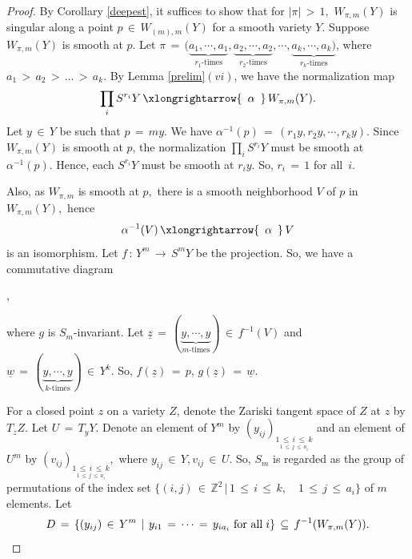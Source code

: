 \documentclass[12pt,reqno]{amsart}
\theoremstyle{definition}
\numberwithin{equation}{section}
\begin{document}
\begin{proof}
By Corollary \ref{deepest}, it suffices to show that for $ |\pi|\,>\,1,$ $ W_{\pi,m}(Y)$ is singular along a point $ p\,\in\, W_{(m),m}(Y)$ for a smooth variety $Y.$ Suppose $ W_{\pi,m}(Y)$ is smooth at $p$. Let $  \pi\,=\, (\underbrace{a_{1},\cdots,a_{1}}_{r_{1}\text{-times}}, \underbrace{a_{2},\cdots,a_{2}}_{r_{2}\text{-times}},\cdots, \underbrace{a_{k},\cdots,a_{k})}_{r_{k}\text{-times}}$, where $a_1\,>\,a_2\,>\,\ldots\,>\,a_k.$ By Lemma \ref{prelim}$(vi)$, we have the normalization map $$ \prod_{i}S^{r_{i}}Y\, \xlongrightarrow{\,\,\,\alpha\,\,\,}\, W_{\pi,m}(Y).$$ Let $ y\,\in\, Y$ be such that $ p\,=\,my.$ We have $ \alpha^{-1}(p)\, =\, (r_{1}y, r_{2}y,\cdots,r_{k}y).$ Since $ W_{\pi,m}(Y) $ is smooth at $p$, the normalization $ \prod_{i}S^{r_{i}}Y$ must be smooth at $ \alpha^{-1}(p).$ Hence, each $S^{r_{i}}Y$ must be smooth at $ r_{i}y.$ So, $ r_{i}\, = \,1$ for all $\hspace{2pt}i$.

Also, as $ W_{\pi,m}$ is smooth at $p,$ there is a smooth neighborhood $V$ of $p$ in $ W_{\pi,m}(Y),$ hence $$ \alpha^{-1}(V)\, \xlongrightarrow{\,\,\,\alpha\,\,\,}\, V$$  is an isomorphism. Let $f\,:\, Y^m\,\to\, S^mY$ be the projection. So, we have a commutative diagram 
\begin{center}
,
\end{center}
 where $g$ is $S_{m}$-invariant. Let $ \underline{z}\,=\, (\underbrace{y,\cdots,y}_{m\text{-times}})\,\in\, f^{-1}(V)$ and $\underline{w}\,=\, (\underbrace{y,\cdots,y}_{k \text{-times}})\,\in\, Y^{k}.$ So, $f(\underline{z})\,=\,p$, $g(\underline{z})\,=\, \underline{w}$. 
 
 For a closed point $z$ on a variety $Z$, denote the Zariski tangent space of $Z$ at $z$ by $T_zZ$. Let $ U\,=\, T_{y}Y.$ 
Denote an element of $Y^{m}$ by $(y_{ij})_ {\underset{1\,\leq\, j\, \leq\, a_{i}}{1\,\leq\, i \,\leq\, k}}$
and an element of $ U^{m}$ by 
$ (v_{ij})_{\underset{1\,\leq\, j\,\leq\, a_{i}}{ 1\,\leq\, i\, \leq\, k}},$ where $y_{ij}\,\in\, Y, v_{ij}\,\in\, U.$ So, $S_m$ is regarded as the group of permutations of the index set $\{(i,j)\,\in\, \mathbb{Z}^2 \,|\, 1\,\leq\, i\,\leq\, k,\quad 1\,\leq\, j \,\leq\, a_i\}$ of $m$ elements.
Let $$ D\,=\, \{ (y_{ij})\,\in\, Y^{m} \hspace{4pt}| \hspace{4pt}y_{i1}\,=\,\cdots \,=\, y_{ia_{i}} \hspace{3pt} \textnormal{for all} \hspace{3pt} i\} \,\subseteq\, f^{-1}(W_{\pi,m}(Y)).$$


\end{proof}
\end{document}
